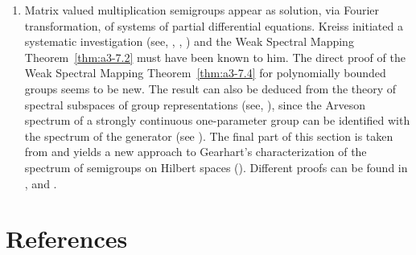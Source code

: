 \begin{enumerate}[label=\emph{Section \arabic*:}, wide, itemsep=1ex]
\item  
Matrix valued multiplication semigroups appear as solution, via Fourier transformation, of systems of partial differential equations.
Kreiss initiated a systematic investigation (see, \eg \textcite{kreiss:1958}, \textcite{kreiss:1959}, \textcite{millerstrang:1966}) and the Weak Spectral Mapping Theorem~\ref{thm:a3-7.2} must have been known to him. 
The direct proof of the Weak Spectral Mapping Theorem~\ref{thm:a3-7.4} for polynomially bounded groups seems to be new. 
The result can also be deduced from the theory of spectral subspaces of group representations (see, \eg \textcite{combesdelaroche:1978}), since the Arveson spectrum of a strongly continuous one-parameter group can be identified with the spectrum of the generator (see \textcite{evans:1976}). 
The final part of this section is taken from \textcite{greiner:1985} and yields a new approach to Gearhart's characterization of the spectrum of semigroups on Hilbert spaces (\textcite{gearhart:1978}). 
Different proofs can be found in \textcite{herbst:1983}, \textcite{howland:1984} and \textcite{pruess:1984}. 
\end{enumerate}
\section*{References}
{\RaggedRight
  \printbibliography[heading=none]
 }


